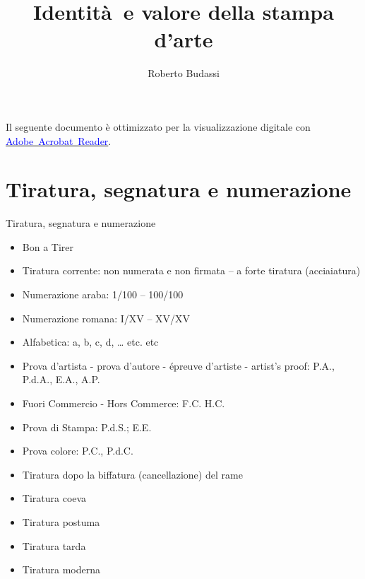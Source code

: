 \documentclass[hidelinks,aspectratio=169]{beamer}
\title[Identità e valore della stampa d'arte]{\textbf{Identità e valore della stampa d'arte}}
\author{Roberto Budassi}
\date{}
\begin{document}
	
		\begin{frame}
		\maketitle
		
		\vspace*{\fill}
		\centering
		\fboxrule=2pt
		\fbox
		{
			\begin{minipage}{0.9\linewidth}
				\small{Il seguente documento è ottimizzato per la visualizzazione digitale con \href{https://get.adobe.com/it/reader/}{\textcolor{blue}{Adobe~Acrobat~Reader}}.}  
			\end{minipage}
		}
	\end{frame}
	
	\begin{frame}
		\tableofcontents
	\end{frame}
	
	
	\section{Tiratura, segnatura e numerazione}
	\begin{frame}{Tiratura, segnatura e numerazione}
		\begin{itemize}
			\item Bon a Tirer
			\item Tiratura corrente: non numerata e non firmata – a forte tiratura (acciaiatura)
			\item Numerazione araba: 1/100 – 100/100
			\item Numerazione romana: I/XV – XV/XV
			\item Alfabetica: a, b, c, d, … etc. etc
			\item Prova d’artista - prova d’autore - épreuve d’artiste - artist’s proof: P.A., P.d.A., E.A., A.P. 
			\item Fuori Commercio - Hors Commerce: F.C. H.C.
			\item Prova di Stampa: P.d.S.; E.E.
			\item Prova colore: P.C., P.d.C.
			\item Tiratura dopo la biffatura (cancellazione) del rame
		\end{itemize}
		\medskip
		\begin{itemize}
			\item Tiratura coeva
			\item Tiratura postuma
			\item Tiratura tarda
			\item Tiratura moderna
		\end{itemize}
	\end{frame}
	
\end{document}
